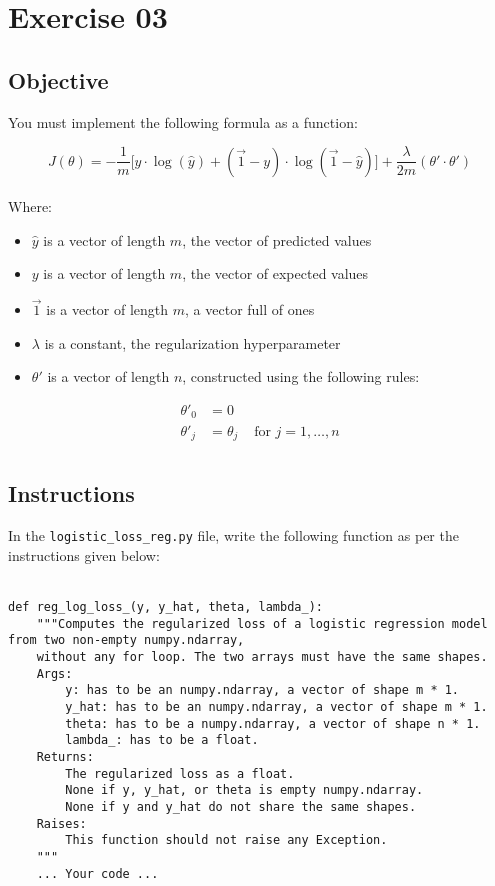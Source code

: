 \chapter{Exercise 03}
%
{}
\makeheaderfilesforbidden

\section*{Objective}
You must implement the following formula as a function:

$$
J( \theta) = -\frac{1} {m} \lbrack y \cdot \log(\hat{y}) + (\vec{1} - y) \cdot \log(\vec{1} - \hat{y})\rbrack + \frac{\lambda}{2m} (\theta' \cdot \theta')
$$
\\
Where:
\begin{itemize}
  \item $\hat{y}$ is a vector of length $m$, the vector of predicted values
  \item $y$ is a vector of length $m$, the vector of expected values
  \item $\vec{1}$ is a vector of length $m$, a vector full of ones
  \item $\lambda$ is a constant, the regularization hyperparameter
  \item $\theta'$ is a vector of length $n$, constructed using the following rules: 
\end{itemize}
$$
\begin{matrix}
\theta'_0 & =  0 \\
\theta'_j & =  \theta_j & \text{ for } j = 1, \dots, n\\    
\end{matrix}
$$
\newpage
\section*{Instructions}
In the \texttt{logistic\_loss\_reg.py} file, write the following function as 
per the instructions given below:\\
\\
\begin{verbatim}
def reg_log_loss_(y, y_hat, theta, lambda_):
	"""Computes the regularized loss of a logistic regression model from two non-empty numpy.ndarray, 
	without any for loop. The two arrays must have the same shapes.
	Args:
		y: has to be an numpy.ndarray, a vector of shape m * 1.
		y_hat: has to be an numpy.ndarray, a vector of shape m * 1.
		theta: has to be a numpy.ndarray, a vector of shape n * 1.
		lambda_: has to be a float.
	Returns:
		The regularized loss as a float.
		None if y, y_hat, or theta is empty numpy.ndarray.
		None if y and y_hat do not share the same shapes.
	Raises:
		This function should not raise any Exception.
	"""
	... Your code ...
\end{verbatim}

